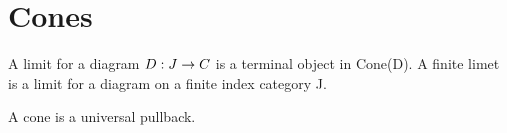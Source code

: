 \section{Cones}

\begin{definition}
  A limit for a diagram $D: J \rightarrow C $ is a terminal object in Cone(D). A finite limet is a limit for a diagram on a finite index category J.
\end{definition}

A cone is a universal pullback.

%
